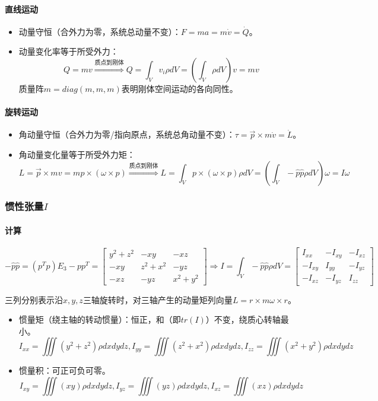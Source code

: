 \documentclass[
12pt, %
a4paper, 
oneside, %
headinclude,footinclude, %
]{scrartcl}
\begin{document}
\paragraph{直线运动}
\begin{itemize}
\item 动量守恒（合外力为零，系统总动量不变）：$ F = ma = m \dot{v} = \dot{Q} $。
\item 动量变化率等于所受外力：
$$ Q = mv \overset{\text{质点到刚体}}{\Longrightarrow} Q = \int_V v_i \rho dV = (\int_V \rho dV) v = mv $$
质量阵$ m = diag(m, m, m) $表明刚体空间运动的各向同性。
\end{itemize} 
\paragraph{旋转运动}
\begin{itemize}
\item 角动量守恒（合外力为零/指向原点，系统总角动量不变）：$ \tau = \vec{p} \times m \dot{v} = \dot{L} $。
\item 角动量变化量等于所受外力矩：
$$ L = \vec{p} \times mv = mp \times (\omega \times p) \overset{\text{质点到刚体}}{\Longrightarrow} L = \int_V p \times (\omega \times p) \rho dV = (\int_V -\hat{p} \hat{p} \rho dV) \omega = I \omega $$
\end{itemize} 
\subsubsection[惯性张量]{惯性张量$ I $}
\paragraph{计算}
$$ -\hat{p} \hat{p} = (p^T p)E_3 - p p^T = \begin{bmatrix} y^2 + z^2 & -xy & -xz \\ -xy & z^2 + x^2 & -yz \\ -xz & -yz & x^2 + y^2 \end{bmatrix} \Rightarrow I = \int_V -\hat{p} \hat{p} \rho dV = \begin{bmatrix} I_{xx} & -I_{xy} & -I_{xz} \\ -I_{xy} & I_{yy} & -I_{yz} \\ -I_{xz} & -I_{yz} & I_{zz} \end{bmatrix} $$

三列分别表示沿$ x, y, z $三轴旋转时，对三轴产生的动量矩列向量$ L = r \times m \omega \times r $。
\begin{itemize}
\item 惯量矩（绕主轴的转动惯量）：恒正，和（即$ tr(I) $）不变，绕质心转轴最小。
$$ I_{xx} = \iiint (y^2 + z^2)\rho dxdydz, I_{yy} = \iiint (z^2 + x^2)\rho dxdydz, I_{zz} = \iiint (x^2 + y^2)\rho dxdydz $$
\item 惯量积：可正可负可零。
$$ I_{xy} = \iiint (xy)\rho dxdydz, I_{yz} = \iiint (yz)\rho dxdydz, I_{xz} = \iiint (xz)\rho dxdydz $$
\end{itemize} 
\end{document}
